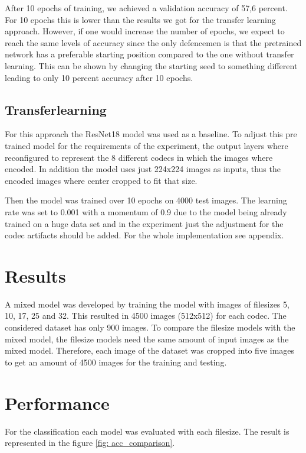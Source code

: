 \documentclass{article}
\begin{document}
\noindent
After 10 epochs of training, we achieved a validation accuracy of 57,6 percent. For 10 epochs this is lower than the results we got for the transfer learning approach. However, if one would increase the number of epochs, we expect to reach the same levels of accuracy since the only defencemen is that the pretrained network has a preferable starting position compared to the one without transfer learning. This can be shown by changing the starting seed to something different leading to only 10 percent accuracy after 10 epochs.

\subsection{Transferlearning}
For this approach the ResNet18 model was used as a baseline. To adjust this pre trained model for the requirements of the experiment, the output layers where reconfigured to represent the 8 different codecs in which the images where encoded.
In addition the model uses just 224x224 images as inputs, thus the encoded images where center cropped to fit that size.

 

\noindent
Then the model was trained over 10 epochs on 4000 test images. The learning rate was set to 0.001 with a momentum of 0.9 due to the model being already trained on a huge data set and in the experiment just the adjustment for the codec artifacts should be added. For the whole implementation see appendix.

\section{Results}
\label{Results}
A mixed model was developed by training the model with images of filesizes 5, 10, 17, 25 and 32. This resulted in 4500 images (512x512) for each codec. The considered dataset has only 900 images. To compare the filesize models with the mixed model, the filesize models need the same amount of input images as the mixed model. Therefore, each image of the dataset was cropped into five images to get an amount of 4500 images for the training and testing.

\section{Performance}
For the classification each model was evaluated with each filesize. The result is represented in the figure \ref{fig: acc_comparison}.
\end{document}
